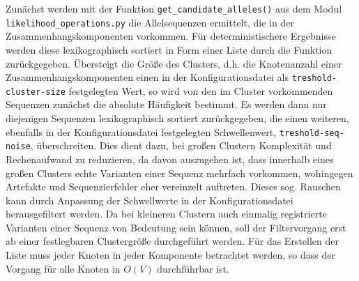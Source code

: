 Zunächst werden mit der Funktion \lstinline|get_candidate_alleles()| aus dem Modul \linebreak \lstinline|likelihood_operations.py| die Allelsequenzen ermittelt, die in der Zusammenhangskomponenten vorkommen. Für deterministischere Ergebnisse werden diese lexikographisch sortiert in Form einer Liste durch die Funktion zurückgegeben. Übersteigt die Größe des Clusters, d.h. die Knotenanzahl einer Zusammenhangskomponenten einen in der Konfigurationsdatei als \lstinline|treshold-cluster-size| festgelegten Wert, so wird von den im Cluster vorkommenden Sequenzen zunächst die absolute Häufigkeit bestimmt. Es werden dann nur diejenigen Sequenzen lexikographisch sortiert zurückgegeben, die einen weiteren, ebenfalls in der Konfigurationsdatei festgelegten Schwellenwert, \lstinline|treshold-seq-noise|, überschreiten. Dies dient dazu, bei großen Clustern Komplexität und Rechenaufwand zu reduzieren, da davon auszugehen ist, dass innerhalb eines großen Clusters echte Varianten einer Sequenz mehrfach vorkommen, wohingegen Artefakte und Sequenzierfehler eher vereinzelt auftreten. Dieses sog. Rauschen kann durch Anpassung der Schwellwerte in der Konfigurationsdatei herausgefiltert werden. Da bei kleineren Clustern auch einmalig registrierte Varianten einer Sequenz von Bedeutung sein können, soll der Filtervorgang erst ab einer festlegbaren Clustergröße durchgeführt werden. Für das Erstellen der Liste muss jeder Knoten in jeder Komponente betrachtet werden, so dass der Vorgang für alle Knoten in $ O(V) $ durchführbar ist.\\


